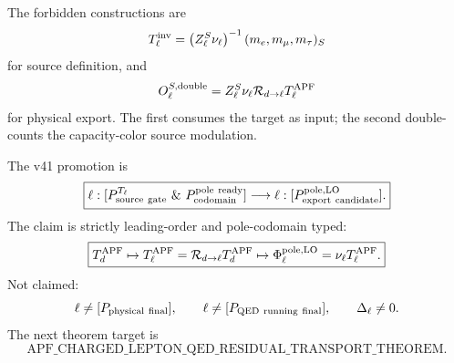 \begin{gate}\label{gate:no-inverse-no-double-v41}
The forbidden constructions are
\[
  T_\ell^{\rm inv}
  =\left(Z_\ell^S\nu_\ell\right)^{-1}(m_e,m_\mu,m_\tau)_S
\]
for source definition, and
\[
  O_\ell^{S,\rm double}=Z_\ell^S\nu_\ell\mathcal R_{d\to\ell}T_\ell^{\rm APF}
\]
for physical export.  The first consumes the target as input; the second double-counts the capacity-color source modulation.
\end{gate}

\begin{statusbox}
The v41 promotion is
\[
  \boxed{
  \ell:[P_{\rm source\ gate}^{T_\ell}\ \&\ P_{\rm codomain}^{\rm pole\ ready}]
  \longrightarrow
  \ell:[P_{\rm export\ candidate}^{\rm pole,LO}].}
\]
The claim is strictly leading-order and pole-codomain typed:
\[
  \boxed{
  T_d^{\rm APF}\mapsto T_\ell^{\rm APF}=\mathcal R_{d\to\ell}T_d^{\rm APF}
  \mapsto \Phi_\ell^{\rm pole,LO}=\nu_\ell T_\ell^{\rm APF}.}
\]
Not claimed:
\[
  \ell\neq[P_{\rm physical\ final}],\qquad
  \ell\neq[P_{\rm QED\ running\ final}],\qquad
  \Delta_\ell\neq0.
\]
The next theorem target is
\[
  \boxed{\text{APF\_CHARGED\_LEPTON\_QED\_RESIDUAL\_TRANSPORT\_THEOREM}.}
\]
\end{statusbox}
